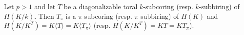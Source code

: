 Let $p > 1$ and let $T$ be a diagonalizable toral $k$-subcoring (resp. $k$-subbiring) of $H(K/k)$. Then $T_\pi$ is a $\pi$-subcoring (resp. $\pi$-subbiring) of $H(K)$ and $H(K/K^T) = K\langle T \rangle = K\langle T_\pi \rangle$ (resp. $H(K/K^T) = KT = KT_\pi$).
